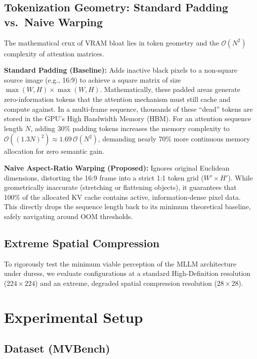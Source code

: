 \documentclass[conference]{IEEEtran}
\newcommand{\bigO}[1]{\mathcal{O}\!\left(#1\right)}
\begin{document}
\subsection{Tokenization Geometry: Standard Padding vs.\ Naive Warping}

The mathematical crux of VRAM bloat lies in token geometry and the
$\bigO{N^2}$ complexity of attention matrices.

\textbf{Standard Padding (Baseline):} Adds inactive black pixels to a
non-square source image (e.g., 16:9) to achieve a square matrix of size
$\max(W,H) \times \max(W,H)$. Mathematically, these padded areas
generate zero-information tokens that the attention mechanism must still
cache and compute against. In a multi-frame sequence, thousands of these
``dead'' tokens are stored in the GPU's High Bandwidth Memory (HBM). For
an attention sequence length $N$, adding 30\% padding tokens increases
the memory complexity to $\bigO{(1.3N)^2} \approx 1.69\,\bigO{N^2}$,
demanding nearly 70\% more continuous memory allocation for zero semantic
gain.

\textbf{Naive Aspect-Ratio Warping (Proposed):} Ignores original
Euclidean dimensions, distorting the 16:9 frame into a strict 1:1 token
grid ($W' \times H'$). While geometrically inaccurate (stretching or
flattening objects), it guarantees that 100\% of the allocated KV cache
contains active, information-dense pixel data. This directly drops the
sequence length back to its minimum theoretical baseline, safely
navigating around OOM thresholds.

\subsection{Extreme Spatial Compression}
To rigorously test the minimum viable perception of the MLLM architecture
under duress, we evaluate configurations at a standard High-Definition
resolution ($224{\times}224$) and an extreme, degraded spatial compression
resolution ($28{\times}28$).

\section{Experimental Setup}
\label{sec:setup}

\subsection{Dataset (MVBench)}
\end{document}
